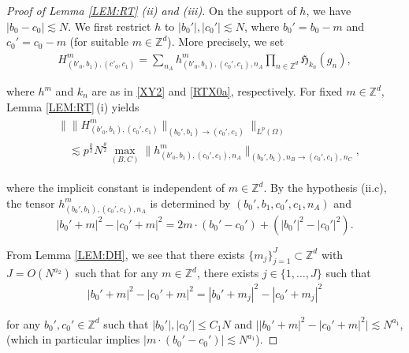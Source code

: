 \documentclass[%
11pt,  reqno]{amsart}
\newcommand{\1}{\hspace{0.2mm}\text{I}\hspace{0.2mm}}
\newcommand{\noi}{\noindent}
\newcommand{\Z}{\mathbb{Z}}
\renewcommand{\O}{\Omega}
\newcommand{\les}{\lesssim}
\numberwithin{equation}{section}
\numberwithin{theorem}{section}
\newcommand{\Hf}{\mathfrak{H}}
\begin{document}
\begin{proof}
[Proof of Lemma \ref{LEM:RT} (ii) and (iii)]


On the support of $h$, we have $|b_0- c_0|\les N$. 
We first restrict $h$ to  $|b_0'|, |c_0'| \les N$, 
where  $b_0' = b_0-m$ and $c_0' = c_0-m$ (for suitable $m \in \Z^d$).
More precisely, we
 set 
\begin{align}
H^m_{(b'_0, b_1),  (c'_0, c_1)} = \sum_{n_A} h^m_{(b'_0, b_1), (c_0', c_1), n_A} 
\prod_{n \in \Z^d} 
\Hf_{k_n}(g_{n}), 
\label{RTX1}
\end{align}



\noi
where $h^m$ and $k_n$ are as in \eqref{XY2} and \eqref{RTX0a}, 
respectively.
For fixed $m \in \Z^d$, 
 Lemma \ref{LEM:RT}\,(i) yields
\begin{align}
\begin{split}
& \big\| \| H_{(b'_0, b_1), (c_0', c_1)}^m \|_{(b_0', b_1) \to (c_0', c_1)} \big\|_{L^p(\O)} \\
& \quad \les p^{\frac k2} N^{\frac \theta 2}
 \max_{(B,C)} \|
h^m_{(b'_0, b_1), (c_0', c_1), n_A} \|_{(b_0', b_1), n_B \to (c_0', c_1),  n_C}, 
\end{split}
\label{RTX2}
\end{align}

\noi
where the implicit constant is independent of $m \in \Z^d$.
By the hypothesis (ii.c), 
the tensor $h^m_{(b_0', b_1), (c_0', c_1), n_A}$ 
is determined by $(b_0', b_1, c_0', c_1, n_A)$ and 
\[|b_0'+m|^2 - |c_0'+m|^2 = 2m \cdot (b_0'-c_0') + (|b_0'|^2 - |c_0'|^2).\]

\noi 
From Lemma \ref{LEM:DH}, 
we see that there exists $\{m_j\}_{j=1}^J \subset \Z^d $ with $J =O(N^{a_2})$ 
such that for any $m \in \Z^d$, 
 there exists $j \in \{1, \dots, J\}$ such that 
\begin{align}
|b_0'+m|^2 - |c_0'+m|^2 = |b_0'+m_j|^2 - |c_0'+m_j|^2 
\label{XY2a}
\end{align}



\noi
for any  $b_0',c_0' \in \Z^d $ such that $|b_0'|, |c_0'| \le C_1 N$ and 
$\big||b_0'+m|^2 - |c_0'+m|^2\big| \les N^{a_1}$, 
(which in particular implies 
$|m \cdot (b_0'-c_0')|\les N^{a_1}$).


\end{proof}
\end{document}
